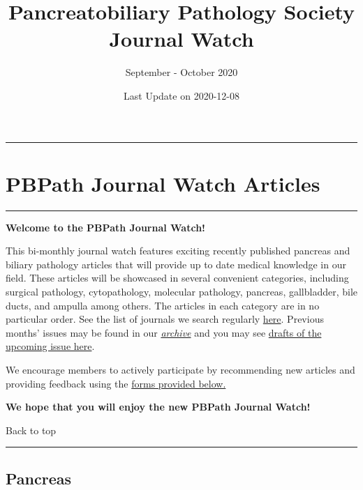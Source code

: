 \documentclass[
]{article}
\title{Pancreatobiliary Pathology Society Journal Watch}
\subtitle{September - October 2020}
\author{}
\date{\vspace{-2.5em}Last Update on 2020-12-08}
\begin{document}
\maketitle

{
\setcounter{tocdepth}{2}
\tableofcontents
}
\begin{center}\rule{0.5\linewidth}{0.5pt}\end{center}

\hypertarget{pbpath_jw}{%
\section{PBPath Journal Watch Articles}\label{pbpath_jw}}

\begin{center}\rule{0.5\linewidth}{0.5pt}\end{center}

\textbf{Welcome to the PBPath Journal Watch!}

This bi-monthly journal watch features exciting recently published
pancreas and biliary pathology articles that will provide up to date
medical knowledge in our field. These articles will be showcased in
several convenient categories, including surgical pathology,
cytopathology, molecular pathology, pancreas, gallbladder, bile ducts,
and ampulla among others. The articles in each category are in no
particular order. See the list of journals we search regularly
\href{http://pbpath.org/pbpath-journal-watch/}{here}. Previous months'
issues may be found in our
\emph{\href{http://pbpath.org/journal-watch-archive/}{archive}} and you
may see \href{http://pbpath.org/journal-watch-upcoming-issue/}{drafts of
the upcoming issue here}.

We encourage members to actively participate by recommending new
articles and providing feedback using the
\protect\hyperlink{feedback}{forms provided below.}

\textbf{We hope that you will enjoy the new PBPath Journal Watch!}

Back to top

\begin{center}\rule{0.5\linewidth}{0.5pt}\end{center}

\pagebreak

\hypertarget{pancreas}{%
\subsection{Pancreas}\label{pancreas}}
\end{document}
